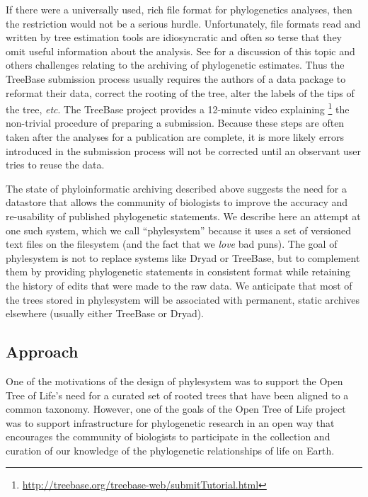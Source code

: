 \documentclass{bioinfo}
\newcommand{\ps}{phylesystem\xspace}
\newcommand{\otol}{Open Tree of Life\xspace}
\begin{document}
If there were a universally used, rich file format for phylogenetics analyses, then the restriction would not be a
    serious hurdle.
Unfortunately, file formats read and written by tree estimation tools are idiosyncratic and often so 
    terse that they omit useful information about the analysis.
See \citet{StoltzfusEtAl2012} for a discussion of this topic and others challenges relating to the archiving of phylogenetic estimates.
Thus the TreeBase submission process usually requires the authors of a data package to reformat their data, correct
    the rooting of the tree, alter the labels of the tips of the tree, {\em etc}.
    The TreeBase project provides a 12-minute video explaining
    \footnote{\url{http://treebase.org/treebase-web/submitTutorial.html}} 
    the non-trivial procedure of preparing a submission.
Because these steps are often taken after the analyses for a publication are complete, it is more likely 
    errors introduced in the submission process will not be corrected until an observant user tries to reuse the data.

The state of phyloinformatic archiving described above suggests the need for a datastore that allows the 
    community of biologists to improve the accuracy and re-usability of published phylogenetic statements.
We describe here an attempt at one such system, which we call ``phylesystem'' because it uses a set of
    versioned text files on the filesystem (and the fact that we {\em love} bad puns).
The goal of \ps is not to replace systems like Dryad or TreeBase, but to complement them by 
    providing phylogenetic statements in consistent format while retaining the history of
    edits that were made to the raw data.
We anticipate that most of the trees stored in \ps will be associated with permanent, static archives
    elsewhere (usually either TreeBase or Dryad).

\subsection{Approach}
One of the motivations of the design of \ps was to support the \otol's need for a curated set
    of rooted trees that have been aligned to a common taxonomy.
However, one of the goals of the \otol project was to support infrastructure for phylogenetic
    research in an open way that encourages the community of biologists to participate in the 
    collection and curation of our knowledge of the phylogenetic relationships of life on Earth.
\end{document}

